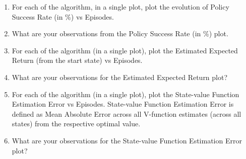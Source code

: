 \documentclass[a4 paper]{article}
\numberwithin{equation}{section}
\newcommand{\0}{\mathbf{0}}
\begin{document}
\begin{enumerate}[label=(\alph*)]
\item For each of the algorithm, in a single plot, plot the evolution of Policy Success Rate (in \%) vs Episodes.

\item What are your observations from the Policy Success Rate (in \%) plot. 

\item For each of the algorithm (in a single plot), plot the Estimated Expected Return (from the start state) vs Episodes.

\item What are your observations for the Estimated Expected Return plot?

\item For each of the algorithm (in a single plot), plot the State-value Function Estimation Error vs Episodes. State-value Function Estimation Error is defined as Mean Absolute Error across all V-function estimates (across all states) from the respective optimal value.  

\item What are your observations for the State-value Function Estimation Error plot?

\end{enumerate}

\end{document}
